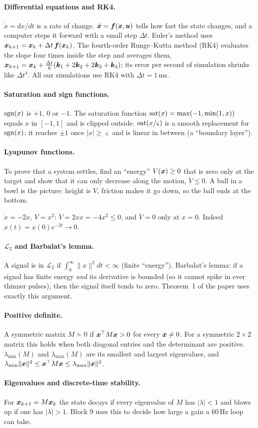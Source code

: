 \paragraph{Differential equations and RK4.} $\dot x=dx/dt$ is a rate of change. $\dot{\bm{x}}=\bm f(\bm{x},\bm{u})$ tells how fast
the state changes, and a computer steps it forward with a small step $\Delta t$. Euler's method uses
$\bm{x}_{k+1}=\bm{x}_k+\Delta t\,\bm f(\bm{x}_k)$. The fourth-order Runge--Kutta method (RK4) evaluates the slope four times
inside the step and averages them, $\bm{x}_{k+1}=\bm{x}_k+\tfrac{\Delta t}{6}(\bm k_1+2\bm k_2+2\bm k_3+\bm k_4)$; its error per
second of simulation shrinks like $\Delta t^4$. All our simulations use RK4 with $\Delta t=1$\,ms.

\paragraph{Saturation and sign functions.} $\operatorname{sgn}(x)$ is $+1$, $0$ or $-1$. The saturation function
$\operatorname{sat}(x)=\max(-1,\min(1,x))$ equals $x$ in $[-1,1]$ and is clipped outside. $\operatorname{sat}(x/\varsigma)$ is a smooth
replacement for $\operatorname{sgn}(x)$: it reaches $\pm1$ once $|x|\ge\varsigma$ and is linear in between (a ``boundary layer'').

\paragraph{Lyapunov functions.} To prove that a system settles, find an ``energy'' $V(\bm{x})\ge0$ that is zero only at the
target and show that it can only decrease along the motion, $\dot V\le0$. A ball in a bowl is the picture: height is
$V$, friction makes it go down, so the ball ends at the bottom.
\begin{toybox}
$\dot x=-2x$, $V=x^2$: $\dot V=2x\dot x=-4x^2\le0$, and $\dot V=0$ only at $x=0$. Indeed $x(t)=x(0)e^{-2t}\to0$.
\end{toybox}

\paragraph{$\mathcal L_2$ and Barbalat's lemma.} A signal is in $\mathcal L_2$ if $\int_0^\infty\|x\|^2dt<\infty$ (finite
``energy''). Barbalat's lemma: if a signal has finite energy \emph{and} its derivative is bounded (so it cannot spike
in ever thinner pulses), then the signal itself tends to zero. Theorem~1 of the paper uses exactly this argument.

\paragraph{Positive definite.} A symmetric matrix $M\succ0$ if $\bm{x}^\top M\bm{x}>0$ for every $\bm{x}\ne0$. For a symmetric
$2\times2$ matrix this holds when both diagonal entries and the determinant are positive. $\lambda_{\min}(M)$ and
$\lambda_{\max}(M)$ are its smallest and largest eigenvalues, and $\lambda_{\min}\|\bm{x}\|^2\le\bm{x}^\top M\bm{x}\le\lambda_{\max}\|\bm{x}\|^2$.

\paragraph{Eigenvalues and discrete-time stability.} For $\bm{x}_{k+1}=M\bm{x}_k$ the state decays if every eigenvalue of $M$ has
$|\lambda|<1$ and blows up if one has $|\lambda|>1$. Block 9 uses this to decide how large a gain a 60\,Hz loop can take.
